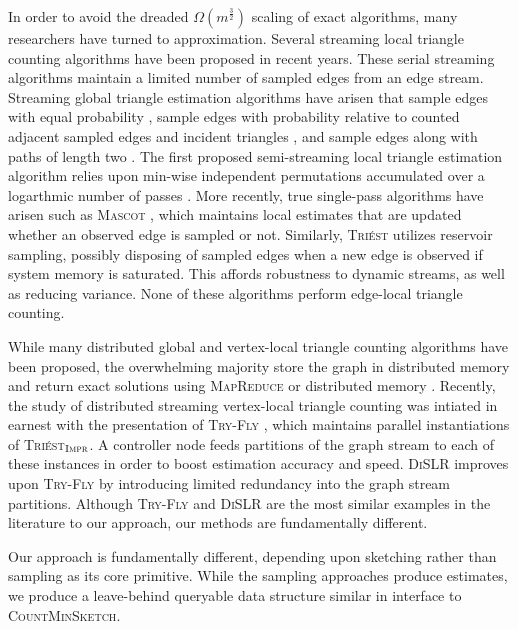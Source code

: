 \documentclass{report}
\newcommand{\algoname}[1]{\textnormal{\textsc{#1}}}
\begin{document}
In order to avoid the dreaded $\Omega(m^{\frac{3}{2}})$ scaling of exact algorithms, many researchers have turned to approximation.
Several streaming local triangle counting algorithms have been proposed in recent years.
These serial streaming algorithms  maintain a limited number of sampled edges from an edge stream.
Streaming global triangle estimation algorithms have arisen that sample edges with equal probability \cite{tsourakakis2009doulion}, sample edges with probability relative to counted adjacent sampled edges and incident triangles \cite{ahmed2017sampling}, and sample edges along with paths of length two \cite{jha2013space}. 
The first proposed semi-streaming local triangle estimation algorithm relies upon min-wise independent permutations accumulated over a logarthmic number of passes \cite{becchetti2008efficient}. 
More recently, true single-pass algorithms have arisen such as \algoname{Mascot} \cite{lim2015mascot}, which maintains local estimates that are updated whether an observed edge is sampled or not.
Similarly, \algoname{Tri\'est} \cite{stefani2017triest} utilizes reservoir sampling, possibly disposing of sampled edges when a new edge is observed if system memory is saturated.
This affords robustness to dynamic streams, as well as reducing variance.
None of these algorithms perform edge-local triangle counting.

While many distributed global and vertex-local triangle counting algorithms have been proposed, the overwhelming majority store the graph in distributed memory and return exact solutions using \algoname{MapReduce} \cite{suri2011counting} or distributed memory \cite{arifuzzaman2013patric, pearce2017triangle}.
Recently, the study of distributed streaming vertex-local triangle counting was intiated in earnest with the presentation of \algoname{Try-Fly} \cite{shin2018tri}, which maintains parallel instantiations of \algoname{Tri\'est$_{\algoname{Impr}}$}.
A controller node feeds partitions of the graph stream to each of these instances in order to boost estimation accuracy and speed.
\algoname{DiSLR} \cite{shin2018dislr} improves upon \algoname{Try-Fly} by introducing limited redundancy into the graph stream partitions.
Although \algoname{Try-Fly} and \algoname{DiSLR} are the most similar examples in the literature to our approach, our methods are fundamentally different.

Our approach is fundamentally different, depending upon sketching rather than sampling as its core primitive. 
While the sampling approaches produce estimates, we produce a leave-behind queryable data structure similar in interface to \algoname{CountMinSketch}.
\end{document}
